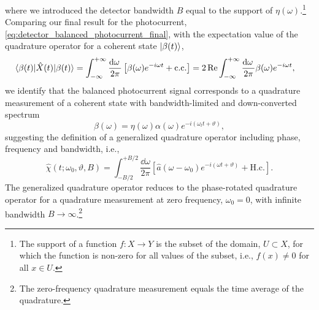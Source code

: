 where we introduced the detector bandwidth $B$ equal to the support of $\eta(\omega)$.\footnote{The support of a function $f\colon X\to Y$ is the subset of the domain, $U\subset X$, for which the function is non-zero for all values of the subset, i.e., $f(x)\neq 0$ for all $x\in U$.}
Comparing our final result for the photocurrent, \cref{eq:detector_balanced_photocurrent_final}, with the expectation value of the quadrature operator for a coherent state $\lvert\beta(t)\rangle$,
\begin{equation}
	\begin{split}
		\bra{\beta(t)}
		\hat{X}(t)
		\ket{\beta(t)}
		&=
		\int_{-\infty}^{+\infty}
		\frac{\dd{\omega}}{2\pi}
		\left[
			\beta(\omega)
			e^{-i\omega t}
			+
			\text{c.c.}
		\right]
		=
		2\Re
		\int_{-\infty}^{+\infty}
		\frac{\dd{\omega}}{2\pi}
		\beta(\omega)
		e^{-i\omega t}
		,
	\end{split}
\end{equation}
we identify that the balanced photocurrent signal corresponds to a quadrature measurement of a coherent state with bandwidth-limited and down-converted spectrum
\begin{equation}
	\beta(\omega)
	=
	\eta(\omega)
	\alpha(\omega)
	e^{-i(\omega_lt+\vartheta)}
	,
\end{equation}
suggesting the definition of a generalized quadrature operator including phase, frequency and bandwidth, i.e.,
\begin{equation}
	\hat{\chi}(t;\omega_0,\vartheta,B)
	=
	\int_{-B/2}^{+B/2}\frac{\dd{\omega}}{2\pi}
	\left[
		\hat{a}(\omega-\omega_0)
		e^{-i(\omega t+\vartheta)}
		+
		\text{H.c.}
	\right]
	.
	\label{eq:quadrature_operator_generalized}
\end{equation}
The generalized quadrature operator reduces to the phase-rotated quadrature operator for a quadrature measurement at zero frequency, $\omega_0=0$, with infinite bandwidth $B\to\infty$.\footnote{The zero-frequency quadrature measurement equals the time average of the quadrature.}